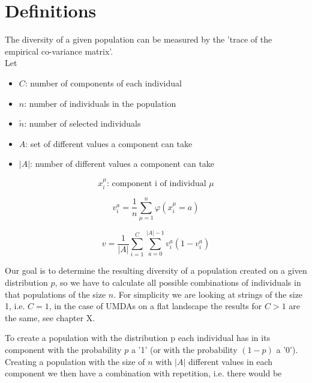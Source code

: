 \documentclass[a4paper,twoside]{report}
\begin{document}
\newpage
\section{Definitions}

The diversity of a given population can be measured by the 'trace of the empirical co-variance matrix'.\\
Let
\begin{itemize}
\item \(C\): number of components of each individual\\
\item \(n\): number of individuals in the population\\
\item \(\tilde{n}\): number of selected individuals\\
\item \(A\): set of different values a component can take\\
\item \(|A|\): number of different values a component can take\\
\end{itemize}

\begin{equation}
x^{\mu}_{i} \text{: component i of individual \(\mu\)}
\end{equation}

\begin{equation}
v^{a}_{i} = \frac{1}{n} \sum_{\mu=1}^{n} \varphi(x^{\mu}_{i} = a)
\end{equation}

\begin{equation}
v = \frac{1}{|A|} \sum_{i=1}^{C} \sum_{a=0}^{|A|-1} v^{a}_{i} (1 - v^{a}_{i})
\end{equation}

Our goal is to determine the resulting diversity of a population created on a given distribution \(p\), so we have to calculate all possible combinations of individuals in that populations of the size \(n\). For simplicity we are looking at strings of the size 1, i.e. \(C = 1\), in the case of UMDAs on a flat landscape the results for \(C > 1\) are the same, see chapter X.

To create a population with the distribution p each individual has in its component with the probability \(p\) a '1' (or with the probability \((1-p)\) a '0'). Creating a population with the size of \(n\) with \(|A|\) different values in each component we then have a combination with repetition, i.e. there would be
\end{document}
